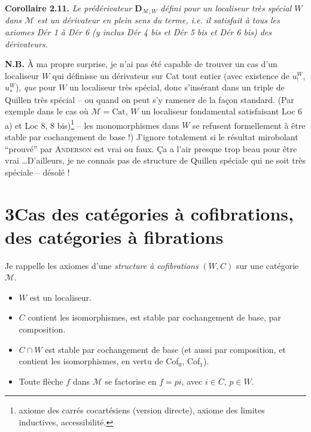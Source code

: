 \documentclass[11pt]{article}
\newcommand{\msp}[1]{\marginpar{\footnotesize [#1]}}
\newcommand{\M}{\mathcal{M}}
\newcommand{\Cat}{\mathrm{Cat}}
\begin{document}
\msp{page 32}
\textbf{Corollaire 2.11.} \textit{Le prédérivateur $\mathbf{D}_{\M,W}$ défini pour un localiseur \textup{très spécial} $W$ dans $\M$ est un dérivateur en plein sens du terme, i.e. il satisfait à tous les axiomes Dér 1 à Dér 6 (y inclus Dér 4 bis et Dér 5 bis et Dér 6 bis) des dérivateurs.}

\textbf{N.B.} À ma propre surprise, je n'ai pas été capable de trouver un cas d'un localiseur $W$ qui définisse un dérivateur sur Cat tout entier (avec existence de $u^{W}_{!}$, $u^{W}_{*}$), \textit{que} pour $W$ un localiseur très spécial, donc s'insérant dans un triple de Quillen très spécial -- ou quand on peut s'y ramener de la façon standard. (Par exemple dans le cas où $\M=\Cat$, $W$ un localiseur fondamental satisfaisant Loc 6 a) et Loc 8, 8 bis)\footnote[19]{axiome des carrés cocartésiens (version directe), axiome des limites inductives, accessibilité.} -- les monomorphismes dans $W$ se refusent formellement à être stable par cochangement de base !) J'ignore totalement si le résultat mirobolant ``prouvé'' par \textsc{Anderson} est vrai ou faux. Ça a l'air presque trop beau pour être vrai \ldots{}D'ailleurs, je ne connais pas de structure de Quillen spéciale qui ne soit très spéciale -- désolé ! %

\msp{page 33}

\section*{3\quad Cas des catégories à cofibrations, des catégories à fibrations}

Je rappelle les axiomes d'une \textit{structure à cofibrations} $(W,C)$ sur une catégorie $\M$.

\begin{itemize}[leftmargin=4em,labelwidth=3.5em,align=left]
\item[Cof$_0$ :] $W$ est un localiseur.
\item[Cof$_1$ :] $C$ contient les isomorphismes, est stable par cochangement de base, par composition.
\item[Cof$_2$ :] $C\cap W$ est stable par cochangement de base (et aussi par composition, et contient les isomorphismes, en vertu de Cof$_0$, Cof$_1$).
\item[Cof$_3$ :] Toute flèche $f$ dans $\M$ se factorise en $f=pi$, avec $i\in C$, $p\in W$.
\end{itemize}
\end{document}
